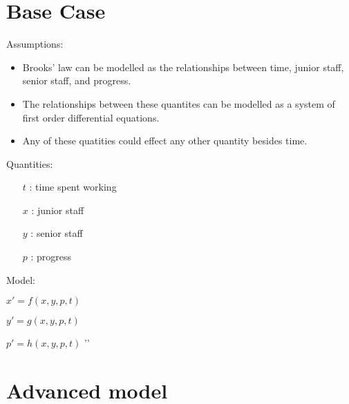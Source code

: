 \documentclass{article}
\newenvironment{unitemize}
    {\begin{list} {}
        {
            \setlength\itemindent{10pt}%
            \setlength\leftmargin{0pt}%
            \setlength\labelwidth{0pt}%
        }
    }%
    {\unskip’’\end{list}}
\begin{document}
\section*{Base Case}
    \begin{itemize}
        \item Assumptions:
            \begin{itemize}
                \item Brooks' law can be modelled as the relationships between time, junior staff, senior staff, and progress.
                \item The relationships between these quantites can be modelled as a system of first order differential equations.
                \item Any of these quatities could effect any other quantity besides time.
            \end{itemize}
        \item Quantities:
            \begin{itemize}
                \item [$t$]: time spent working
                \item [$x$]: junior staff
                \item [$y$]: senior staff
                \item [$p$]: progress
            \end{itemize}
        \item Model:
            \begin{unitemize}
                \item $x\prime = f\left(x, y, p, t\right)$
                \item $y\prime = g\left(x, y, p, t\right)$
                \item $p\prime = h\left(x, y, p, t\right)$
            \end{unitemize}
    \end{itemize}

\section*{Advanced model}
\end{document}
